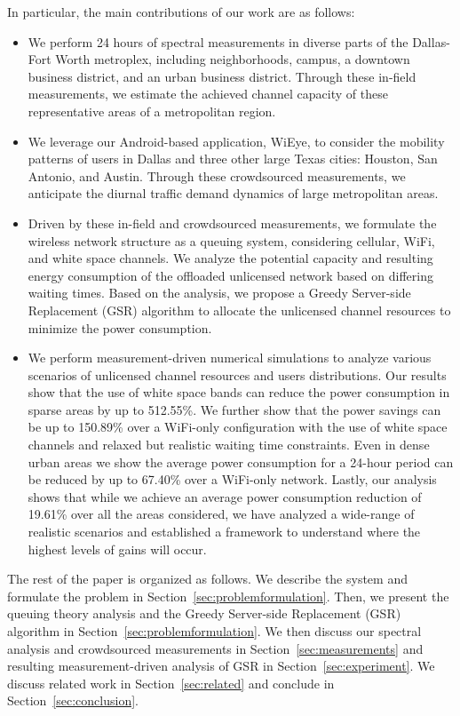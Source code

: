 In particular, the main contributions of our work are as follows:
\begin{itemize}
\item We perform 24 hours of spectral measurements in diverse parts of the Dallas-Fort Worth metroplex, including neighborhoods, campus, a downtown business district, and an urban business district. Through these in-field measurements, we estimate the achieved channel capacity of these representative areas of a metropolitan region.
\item We leverage our Android-based application, WiEye, to consider the mobility patterns of users in Dallas and three other large Texas cities: Houston, San Antonio, and Austin.  Through these crowdsourced measurements, we anticipate the diurnal traffic demand dynamics of large metropolitan areas.
\item Driven by these in-field and crowdsourced measurements, we formulate the wireless network structure as a queuing system, considering cellular, WiFi, and white space channels. We analyze the potential capacity and resulting energy consumption of the offloaded unlicensed network based on differing waiting times. Based on the analysis, we propose a Greedy Server-side Replacement (GSR) algorithm to allocate the unlicensed channel resources to minimize the power consumption.
\item We perform measurement-driven numerical simulations to analyze various scenarios of unlicensed channel resources and users distributions. Our results show that the use of white space bands can reduce the power consumption in sparse areas by up to 512.55\%. 
We further show that the power savings can be up to 150.89\% over a WiFi-only configuration with the use of white space channels and relaxed but realistic waiting time constraints.
Even in dense urban areas we show the average power consumption for a 24-hour period can be reduced by up to 67.40\% over a WiFi-only network. 
Lastly, our analysis shows that while we achieve an average power consumption reduction of 19.61\% over all the areas considered, we have analyzed a wide-range of realistic scenarios and established a framework to understand where the highest levels of gains will occur.
\end{itemize}

The rest of the paper is organized as follows. We describe the system and formulate the problem in Section~\ref{sec:problemformulation}. Then, we present the queuing theory analysis and the Greedy Server-side Replacement (GSR) algorithm in Section~\ref{sec:problemformulation}. We then discuss our spectral analysis and crowdsourced measurements in Section~\ref{sec:measurements} and resulting measurement-driven analysis of GSR in Section~\ref{sec:experiment}. We discuss related work in Section~\ref{sec:related} and conclude in Section~\ref{sec:conclusion}.
